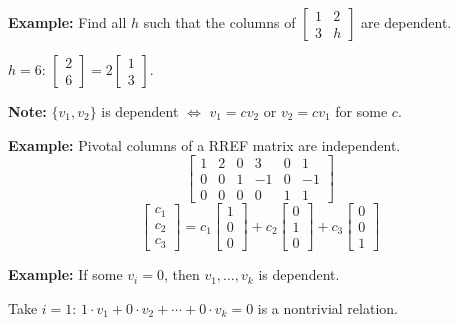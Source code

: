 \documentclass{article}
\begin{document}
\medskip

\textbf{Example:} Find all $h$ such that the columns of $\begin{bmatrix} 1 & 2 \\ 3 & h \end{bmatrix}$ are dependent.

\medskip

$h = 6$: $\begin{bmatrix} 2 \\ 6 \end{bmatrix} = 2 \begin{bmatrix} 1 \\ 3 \end{bmatrix}$.

\newpage

\textbf{Note:} $\{v_1, v_2\}$ is dependent $\iff$ $v_1 = cv_2$ or $v_2 = cv_1$ for some $c$.

\bigskip

\textbf{Example:} Pivotal columns of a RREF matrix are independent.
\[
\begin{bmatrix} 1 & 2 & 0 & 3 & 0 & 1 \\ 0 & 0 & 1 & -1 & 0 & -1 \\ 0 & 0 & 0 & 0 & 1 & 1 \end{bmatrix}
\]
\[
\begin{bmatrix} c_1 \\ c_2 \\ c_3 \end{bmatrix}
= c_1 \begin{bmatrix} 1 \\ 0 \\ 0 \end{bmatrix} + c_2 \begin{bmatrix} 0 \\ 1 \\ 0 \end{bmatrix} + c_3 \begin{bmatrix} 0 \\ 0 \\ 1 \end{bmatrix}
\]

\bigskip

\textbf{Example:} If some $v_i = 0$, then $v_1, \ldots, v_k$ is dependent.

\medskip

Take $i = 1$: $1 \cdot v_1 + 0 \cdot v_2 + \cdots + 0 \cdot v_k = 0$ is a nontrivial relation.

\bigskip
\end{document}
